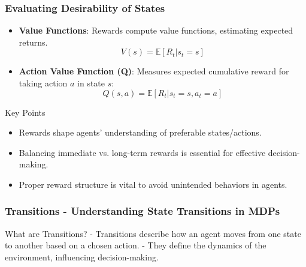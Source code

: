 \documentclass[aspectratio=169]{beamer}
\begin{document}
\begin{frame}[fragile]
    \frametitle{Evaluating Desirability of States}
    \begin{itemize}
        \item \textbf{Value Functions}: Rewards compute value functions, estimating expected returns.
        \begin{equation}
            V(s) = \mathbb{E}[R_t | s_t = s]
        \end{equation}
        \item \textbf{Action Value Function (Q)}: Measures expected cumulative reward for taking action $a$ in state $s$:
        \begin{equation}
            Q(s, a) = \mathbb{E}[R_t | s_t = s, a_t = a]
        \end{equation}
    \end{itemize}

    \begin{block}{Key Points}
        \begin{itemize}
            \item Rewards shape agents' understanding of preferable states/actions.
            \item Balancing immediate vs. long-term rewards is essential for effective decision-making.
            \item Proper reward structure is vital to avoid unintended behaviors in agents.
        \end{itemize}
    \end{block}
\end{frame}

\begin{frame}[fragile]
    \frametitle{Transitions - Understanding State Transitions in MDPs}
    \begin{block}{What are Transitions?}
        - Transitions describe how an agent moves from one state to another based on a chosen action.
        - They define the dynamics of the environment, influencing decision-making.
    \end{block}
\end{frame}
\end{document}
